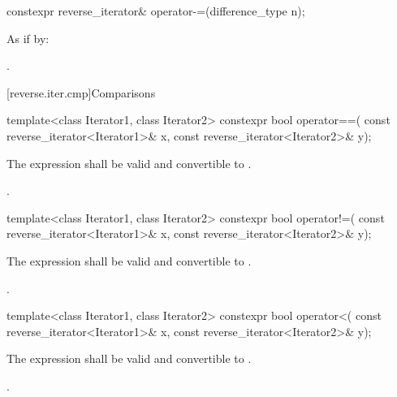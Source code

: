 %
\begin{itemdecl}
constexpr reverse_iterator& operator-=(difference_type n);
\end{itemdecl}

\begin{itemdescr}
\pnum
\effects
As if by: 

\pnum
\returns
{}.
\end{itemdescr}

[reverse.iter.cmp]{Comparisons}

%
\begin{itemdecl}
template<class Iterator1, class Iterator2>
  constexpr bool operator==(
    const reverse_iterator<Iterator1>& x,
    const reverse_iterator<Iterator2>& y);
\end{itemdecl}

\begin{itemdescr}
\pnum
\constraints
The expression  shall be valid and
convertible to .

\pnum
\returns
{}.
\end{itemdescr}

%
\begin{itemdecl}
template<class Iterator1, class Iterator2>
  constexpr bool operator!=(
    const reverse_iterator<Iterator1>& x,
    const reverse_iterator<Iterator2>& y);
\end{itemdecl}

\begin{itemdescr}
\pnum
\constraints
The expression  shall be valid and
convertible to .

\pnum
\returns
{}.
\end{itemdescr}

%
\begin{itemdecl}
template<class Iterator1, class Iterator2>
  constexpr bool operator<(
    const reverse_iterator<Iterator1>& x,
    const reverse_iterator<Iterator2>& y);
\end{itemdecl}

\begin{itemdescr}
\pnum
\constraints
The expression  shall be valid and
convertible to .

\pnum
\returns
{}.
\end{itemdescr}

